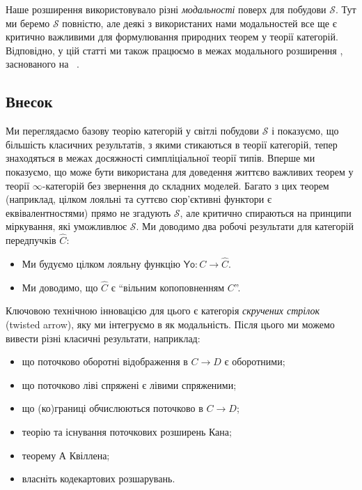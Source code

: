 \documentclass[12pt]{article}
\newcommand{\parencite}{\cite}
\newcommand{\Space}{\mathcal{S}}
\newcommand{\PSH}[1]{\widehat{#1}}
\newcommand{\Yo}{\mathsf{Yo}}
\begin{document}
Наше розширення \STT{} використовувало різні \emph{модальності} поверх \HoTT{} для побудови $\Space$. Тут ми беремо $\Space$ повністю, але деякі з використаних нами модальностей все ще є критично важливими для формулювання природних теорем
у теорії категорій. Відповідно, у цій статті ми також працюємо в межах модального розширення \HoTT{}, заснованого на
\MTT{}~\parencite{gratzer:2020}.

\subsection{Внесок}
Ми переглядаємо базову теорію категорій у світлі побудови $\Space$ і показуємо, що
більшість класичних результатів, з якими стикаються в теорії категорій, тепер знаходяться в межах досяжності симпліціальної
теорії типів. Вперше ми показуємо, що \STT{} може бути використана для доведення життєво важливих теорем у
теорії $\infty$-категорій без звернення до складних моделей. Багато з цих теорем
(наприклад, цілком лояльні та суттєво сюр'єктивні функтори є еквівалентностями) прямо не згадують
$\Space$, але критично спираються на принципи міркування, які уможливлює $\Space$. Ми доводимо два
робочі результати для категорій передпучків $\PSH{C}$:
\begin{itemize}
\item Ми будуємо цілком лояльну функцію $\Yo : C \to \PSH{C}$.
\item Ми доводимо, що $\PSH{C}$ є ``вільним копоповненням $C$''.
\end{itemize}
Ключовою технічною інновацією для цього є категорія \emph{скручених стрілок} (twisted arrow), яку ми інтегруємо в
\STT{} як модальність. Після цього ми можемо вивести різні класичні результати, наприклад:
\begin{itemize}
\item що поточково оборотні відображення в $C \to D$ є оборотними;
\item що поточково ліві спряжені є лівими спряженими;
\item що (ко)границі обчислюються поточково в $C \to D$;
\item теорію та існування поточкових розширень Кана;
\item теорему А Квіллена;
\item власніть кодекартових розшарувань.
\end{itemize}
\end{document}
